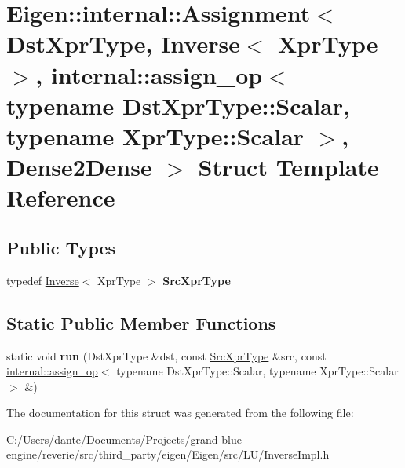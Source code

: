 \hypertarget{struct_eigen_1_1internal_1_1_assignment_3_01_dst_xpr_type_00_01_inverse_3_01_xpr_type_01_4_00_019b24182f99081c1fc09beae63c4c392d}{}\section{Eigen\+::internal\+::Assignment$<$ Dst\+Xpr\+Type, Inverse$<$ Xpr\+Type $>$, internal\+::assign\+\_\+op$<$ typename Dst\+Xpr\+Type\+::Scalar, typename Xpr\+Type\+::Scalar $>$, Dense2\+Dense $>$ Struct Template Reference}
\label{struct_eigen_1_1internal_1_1_assignment_3_01_dst_xpr_type_00_01_inverse_3_01_xpr_type_01_4_00_019b24182f99081c1fc09beae63c4c392d}
\subsection*{Public Types}
\begin{DoxyCompactItemize}
\item 
\mbox{\label{struct_eigen_1_1internal_1_1_assignment_3_01_dst_xpr_type_00_01_inverse_3_01_xpr_type_01_4_00_019b24182f99081c1fc09beae63c4c392d_a5da1a8b1aecc8ceb7b2086590499d960}} 
typedef \mbox{\hyperlink{class_eigen_1_1_inverse}{Inverse}}$<$ Xpr\+Type $>$ {\bfseries Src\+Xpr\+Type}
\end{DoxyCompactItemize}
\subsection*{Static Public Member Functions}
\begin{DoxyCompactItemize}
\item 
\mbox{\label{struct_eigen_1_1internal_1_1_assignment_3_01_dst_xpr_type_00_01_inverse_3_01_xpr_type_01_4_00_019b24182f99081c1fc09beae63c4c392d_a450acc4a5ca9172c882fd6d19a5ba35c}} 
static void {\bfseries run} (Dst\+Xpr\+Type \&dst, const \mbox{\hyperlink{class_eigen_1_1_inverse}{Src\+Xpr\+Type}} \&src, const \mbox{\hyperlink{struct_eigen_1_1internal_1_1assign__op}{internal\+::assign\+\_\+op}}$<$ typename Dst\+Xpr\+Type\+::\+Scalar, typename Xpr\+Type\+::\+Scalar $>$ \&)
\end{DoxyCompactItemize}


The documentation for this struct was generated from the following file\+:\begin{DoxyCompactItemize}
\item 
C\+:/\+Users/dante/\+Documents/\+Projects/grand-\/blue-\/engine/reverie/src/third\+\_\+party/eigen/\+Eigen/src/\+L\+U/Inverse\+Impl.\+h\end{DoxyCompactItemize}
